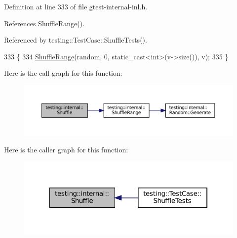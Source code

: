 Definition at line 333 of file gtest-\/internal-\/inl.\+h.



References Shuffle\+Range().



Referenced by testing\+::\+Test\+Case\+::\+Shuffle\+Tests().


\begin{DoxyCode}
333                                                              \{
334   \hyperlink{namespacetesting_1_1internal_a0e1d3dc36138a591769412d4c7779861}{ShuffleRange}(random, 0, static\_cast<int>(v->size()), v);
335 \}
\end{DoxyCode}
Here is the call graph for this function\+:
\nopagebreak
\begin{figure}[H]
\begin{center}
\leavevmode
\includegraphics[width=350pt]{namespacetesting_1_1internal_a90d9e6ffe8522a7eb1b2ce9b1a0c4673_cgraph}
\end{center}
\end{figure}
Here is the caller graph for this function\+:
\nopagebreak
\begin{figure}[H]
\begin{center}
\leavevmode
\includegraphics[width=322pt]{namespacetesting_1_1internal_a90d9e6ffe8522a7eb1b2ce9b1a0c4673_icgraph}
\end{center}
\end{figure}
\mbox{\label{namespacetesting_1_1internal_a0e1d3dc36138a591769412d4c7779861}} 
